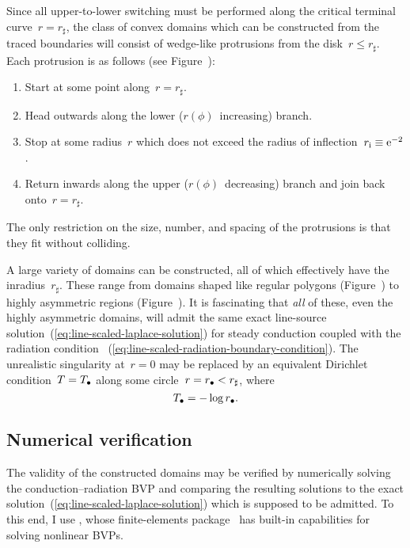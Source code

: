 Since all upper-to-lower switching must be performed
along the critical terminal curve~$r = r_\sharp$,
the class of convex domains which can be constructed
from the traced boundaries
will consist of wedge-like protrusions from the disk~$r \le r_\sharp$.
Each protrusion is as follows (see Figure~\tbd):
\begin{enumerate}
  \item
    Start at some point along~$r = r_\sharp$.
  \item
    Head outwards along the lower ($r (\phi)$~increasing) branch.
  \item
    Stop at some radius~$r$ which does not exceed
    the radius of inflection~$r_{\mathrm{i}} \equiv \mathrm{e}^{-2}$.
  \item
    Return inwards along the upper ($r (\phi)$~decreasing) branch
    and join back onto~$r = r_\sharp$.
\end{enumerate}
The only restriction on the size, number, and spacing of the protrusions
is that they fit without colliding.

A large variety of domains can be constructed,
all of which effectively have the inradius~$r_\sharp$.
These range from domains shaped like regular polygons
(Figure~\tbd)
to highly asymmetric regions
(Figure~\tbd).
It is fascinating that \emph{all} of these,
even the highly asymmetric domains,
will admit the same
exact line-source solution~(\ref{eq:line-scaled-laplace-solution})
for steady conduction coupled with the radiation condition~%
  (\ref{eq:line-scaled-radiation-boundary-condition}).
The unrealistic singularity at~$r = 0$
may be replaced by an equivalent Dirichlet condition~$T = T_\bullet$
along some circle~$r = r_\bullet < r_\sharp$,
where
\begin{equation}
  T_\bullet = -\log r_\bullet.
  \label{eq:line-scaled-equivalent-dirichlet-relation}
\end{equation}

\subsection{Numerical verification}
\label{sec:line.convex.verification}

The validity of the constructed domains may be verified
by numerically solving the conduction--radiation BVP
and comparing the resulting solutions
to the exact solution~(\ref{eq:line-scaled-laplace-solution})
which is supposed to be admitted.
To this end, I use ,
whose finite-elements package~
has built-in capabilities for solving nonlinear BVPs.

